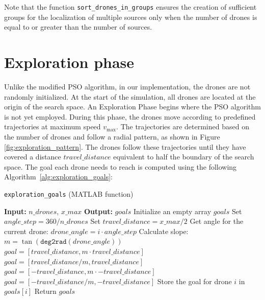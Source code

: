 \par Note that the function \texttt{sort\_drones\_in\_groups} ensures the creation of sufficient groups 
for the localization of multiple sources only when the number of drones is equal to or greater than 
the number of sources.

\section{Exploration phase}
\par Unlike the modified PSO algorithm, in our implementation, the drones are not randomly initialized. 
At the start of the simulation, all drones are located at the origin of the search space. 
An Exploration Phase begins where the PSO algorithm is not yet employed. 
During this phase, the drones move according to predefined trajectories at maximum speed $v_{\text{max}}$. 
The trajectories are determined based on the number of drones and follow a radial pattern, as shown in Figure \ref{fig:exploration_pattern}. 
The drones follow these trajectories until they have covered a distance $travel\_distance$ equivalent to half the boundary of the search space.
The goal each drone needs to reach is computed using the following Algorithm~\ref{alg:exploration_goals}:

\begin{algorithm}[H]
    \caption{\texttt{exploration\_goals} (MATLAB function)} \label{alg:exploration_goals}
    \begin{algorithmic}[1]
        \State \textbf{Input:} $n\_{drones}$, $x\_{max}$
        \State \textbf{Output:} $goals$ 
        \State Initialize an empty array $goals$
        \State Set $angle\_step = 360 / n\_{drones}$
        \State Set $travel\_distance = x\_{max} / 2$ 
            \State Get angle for the current drone: $drone\_angle = i \cdot angle\_step$
            \State Calculate slope: $m = \tan(\texttt{deg2rad}(drone\_angle))$
                \State $goal = [travel\_distance, m \cdot travel\_distance]$ 
                \State $goal = [travel\_distance / m, travel\_distance]$ 
                \State $goal = [-travel\_distance, m \cdot -travel\_distance]$ 
                \State $goal = [-travel\_distance / m, -travel\_distance]$ 
            \EndIf
            \State Store the goal for drone $i$ in $goals[i]$
        \EndFor
        \State Return $goals$
    \end{algorithmic}
\end{algorithm}

